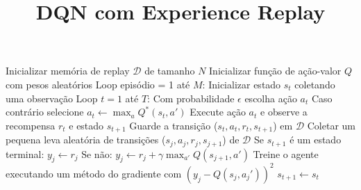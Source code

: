 \documentclass[brazilian,preview]{standalone}
\title{DQN com Experience Replay}
\begin{document}
\begin{algorithm}
Inicializar memória de replay $\mathcal{D}$ de tamanho $N$
Inicializar função de ação-valor $Q$ com pesos aleatórios
Loop episódio = 1 até $M$:
    Inicializar estado $s_t$ coletando uma observação
    Loop $t = 1$ até $T$:
        Com probabilidade $\epsilon$ escolha ação $a_t$
        Caso contrário selecione $a_t \leftarrow \operatorname{max}_{a} Q^*(s_t, a')$
        Execute ação $a_t$ e observe a recompensa $r_t$ e estado $s_{t+1}$
        Guarde a transição ($s_t,a_t,r_t,s_{t+1}$) em $\mathcal{D}$
        Coletar um pequena leva aleatória de transições ($s_j,a_j,r_j,s_{j+1}$) de $\mathcal{D}$
        Se $s_{t+1}$ é um estado terminal:
            $y_j \leftarrow r_j$
        Se não:
            $y_j \leftarrow r_j + \gamma \operatorname{max}_{a'}Q(s_{j+1}, a')$
        Treine o agente executando um método do gradiente com $(y_j - Q(s_j,a_j'))^2$
        $s_{t+1} \leftarrow s_{t}$ 
\end{algorithm}
\end{document}
